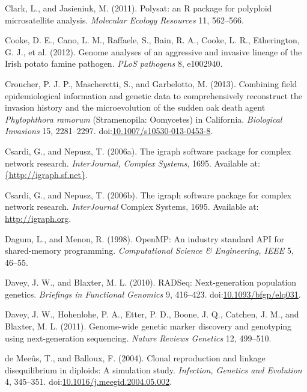 \documentclass[double,12pt]{beavtex}
\begin{document}
  \hypertarget{ref-polysat}{}
  Clark, L., and Jasieniuk, M. (2011). Polysat: an R package for polyploid
  microsatellite analysis. \emph{Molecular Ecology Resources} 11,
  562--566.
  
  \hypertarget{ref-cooke2012genome}{}
  Cooke, D. E., Cano, L. M., Raffaele, S., Bain, R. A., Cooke, L. R.,
  Etherington, G. J., et al. (2012). Genome analyses of an aggressive and
  invasive lineage of the Irish potato famine pathogen. \emph{PLoS
  pathogens} 8, e1002940.
  
  \hypertarget{ref-croucher2013combining}{}
  Croucher, P. J. P., Mascheretti, S., and Garbelotto, M. (2013).
  Combining field epidemiological information and genetic data to
  comprehensively reconstruct the invasion history and the microevolution
  of the sudden oak death agent \emph{Phytophthora ramorum} (Stramenopila:
  Oomycetes) in California. \emph{Biological Invasions} 15, 2281--2297.
  doi:\href{https://doi.org/10.1007/s10530-013-0453-8}{10.1007/s10530-013-0453-8}.
  
  \hypertarget{ref-igraph}{}
  Csardi, G., and Nepusz, T. (2006a). The igraph software package for
  complex network research. \emph{InterJournal, Complex Systems}, 1695.
  Available at:
  \href{\%7Bhttp://igraph.sf.net\%7D}{\{http://igraph.sf.net\}}.
  
  \hypertarget{ref-csardi2006igraph}{}
  Csardi, G., and Nepusz, T. (2006b). The igraph software package for
  complex network research. \emph{InterJournal} Complex Systems, 1695.
  Available at: \url{http://igraph.org}.
  
  \hypertarget{ref-dagum1998openmp}{}
  Dagum, L., and Menon, R. (1998). OpenMP: An industry standard API for
  shared-memory programming. \emph{Computational Science \& Engineering,
  IEEE} 5, 46--55.
  
  \hypertarget{ref-davey2010rad}{}
  Davey, J. W., and Blaxter, M. L. (2010). RADSeq: Next-generation
  population genetics. \emph{Briefings in Functional Genomics} 9,
  416--423.
  doi:\href{https://doi.org/10.1093/bfgp/elq031}{10.1093/bfgp/elq031}.
  
  \hypertarget{ref-davey2011genome}{}
  Davey, J. W., Hohenlohe, P. A., Etter, P. D., Boone, J. Q., Catchen, J.
  M., and Blaxter, M. L. (2011). Genome-wide genetic marker discovery and
  genotyping using next-generation sequencing. \emph{Nature Reviews
  Genetics} 12, 499--510.
  
  \hypertarget{ref-de2004clonal}{}
  de Meeûs, T., and Balloux, F. (2004). Clonal reproduction and linkage
  disequilibrium in diploids: A simulation study. \emph{Infection,
  Genetics and Evolution} 4, 345--351.
  doi:\href{https://doi.org/10.1016/j.meegid.2004.05.002}{10.1016/j.meegid.2004.05.002}.
  
\end{document}
